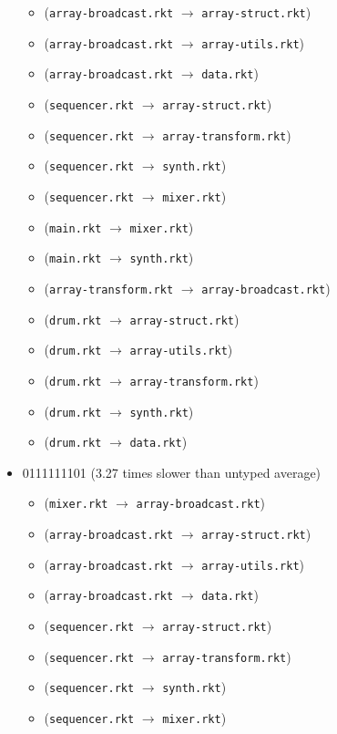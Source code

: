 \documentclass{article}
\newcommand{\mono}[1]{\texttt{#1}}
\begin{document}
\begin{itemize}
\begin{itemize}
  \item (\mono{array-broadcast.rkt} $\rightarrow$ \mono{array-struct.rkt})
  \item (\mono{array-broadcast.rkt} $\rightarrow$ \mono{array-utils.rkt})
  \item (\mono{array-broadcast.rkt} $\rightarrow$ \mono{data.rkt})
  \item (\mono{sequencer.rkt} $\rightarrow$ \mono{array-struct.rkt})
  \item (\mono{sequencer.rkt} $\rightarrow$ \mono{array-transform.rkt})
  \item (\mono{sequencer.rkt} $\rightarrow$ \mono{synth.rkt})
  \item (\mono{sequencer.rkt} $\rightarrow$ \mono{mixer.rkt})
  \item (\mono{main.rkt} $\rightarrow$ \mono{mixer.rkt})
  \item (\mono{main.rkt} $\rightarrow$ \mono{synth.rkt})
  \item (\mono{array-transform.rkt} $\rightarrow$ \mono{array-broadcast.rkt})
  \item (\mono{drum.rkt} $\rightarrow$ \mono{array-struct.rkt})
  \item (\mono{drum.rkt} $\rightarrow$ \mono{array-utils.rkt})
  \item (\mono{drum.rkt} $\rightarrow$ \mono{array-transform.rkt})
  \item (\mono{drum.rkt} $\rightarrow$ \mono{synth.rkt})
  \item (\mono{drum.rkt} $\rightarrow$ \mono{data.rkt})
  \end{itemize}
\item 0111111101 (3.27 times slower than untyped average)
  \begin{itemize}
  \item (\mono{mixer.rkt} $\rightarrow$ \mono{array-broadcast.rkt})
  \item (\mono{array-broadcast.rkt} $\rightarrow$ \mono{array-struct.rkt})
  \item (\mono{array-broadcast.rkt} $\rightarrow$ \mono{array-utils.rkt})
  \item (\mono{array-broadcast.rkt} $\rightarrow$ \mono{data.rkt})
  \item (\mono{sequencer.rkt} $\rightarrow$ \mono{array-struct.rkt})
  \item (\mono{sequencer.rkt} $\rightarrow$ \mono{array-transform.rkt})
  \item (\mono{sequencer.rkt} $\rightarrow$ \mono{synth.rkt})
  \item (\mono{sequencer.rkt} $\rightarrow$ \mono{mixer.rkt})

\end{itemize}
\end{itemize}
\end{document}
